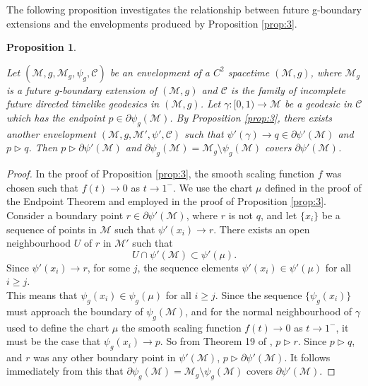 \documentclass[pdflatex,sn-mathphys-num]{sn-jnl}
\newcommand{\Junbang}[1]{{\color{magenta}#1}}
\newtheorem{prop}[theorem]{Proposition}
\theoremstyle{definition}
\begin{document}
The following proposition investigates the relationship between future g-boundary extensions and the envelopments produced by Proposition \ref{prop:3}.

\begin{prop}\label{prop:covering}

Let $(\mathcal{M},g,\mathcal{M}_g,\psi_g,\mathcal{C})$ be an envelopment of a $C^{2}$ spacetime $(\mathcal{M},g)$, where $\mathcal{M}_g$ is a future g-boundary extension of $(\mathcal{M},g)$ and $\mathcal{C}$ is the family of incomplete future directed timelike geodesics in $(\mathcal{M},g)$. Let $\gamma: [0,1) \rightarrow \mathcal{M}$ be a geodesic in $\mathcal{C}$ which has the endpoint  $p \in \partial\psi_g(\mathcal{M})$. By Proposition \ref{prop:3}, there exists another envelopment  $(\mathcal{M},g,\mathcal{M}',\psi',\mathcal{C})$ such that $\psi'(\gamma) \rightarrow q \in \partial\psi'(\mathcal{M})$ and $p \vartriangleright q$. Then $p \vartriangleright \partial\psi'(\mathcal{M})$ and $\partial\psi_g(\mathcal{M}) = \mathcal{M}_g\setminus \psi_g(\mathcal{M})$ covers $\partial\psi'(\mathcal{M})$.
\end{prop}
\begin{proof}
    In the proof of Proposition \ref{prop:3}, the smooth scaling function $f$ was chosen such that $f(t) \rightarrow 0$ as $t \rightarrow 1^-$. We use the chart $\mu$ defined in the proof of the Endpoint Theorem \cite{Scott_2021} and employed in the proof of Proposition \ref{prop:3}.\\
    
    Consider a boundary point $r \in \partial\psi'(\mathcal{M})$, where $r$ is not $q$, and let $\{x_i\}$ be a sequence of points in $\mathcal{M}$ such that $\psi'(x_i) \rightarrow r$. There exists an open neighbourhood $U$ of $r$ in $\mathcal{M}'$ such that $$ U \cap \psi'(\mathcal{M}) \subset \psi'(\mu).$$ Since $\psi'(x_i) \rightarrow r$, for some $j$, the sequence elements $\psi'(x_i) \in \psi'(\mu)$ for all $i \geq j$.\\

    This means that $\psi_g(x_i) \in \psi_g(\mu)$ for all $i \geq j$. Since the sequence $\{\psi_g(x_i)\}$ must approach the boundary of $\psi_g(\mathcal{M})$, and for the normal neighbourhood of $\gamma$ used to define the chart $\mu$ the smooth scaling function $f(t) \rightarrow 0$ as $t \rightarrow 1^-$, it must be the case that $\psi_g(x_i) \rightarrow p$. So from Theorem 19 of \cite{scott1994abstract}, $p \vartriangleright r$. Since $p \vartriangleright q$, and $r$ was any other boundary point in $\psi'(\mathcal{M})$, $p \vartriangleright \partial\psi'(\mathcal{M})$. It follows immediately from this that $\partial\psi_g(\mathcal{M}) = \mathcal{M}_g\setminus \psi_g(\mathcal{M})$ covers $\partial\psi'(\mathcal{M})$. 
    
\end{proof}
\end{document}
